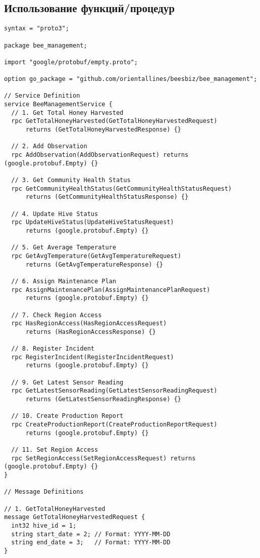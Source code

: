 \documentclass{article}
\begin{document}
\subsection{Использование функций/процедур}

\begin{lstlisting}
syntax = "proto3";

package bee_management;

import "google/protobuf/empty.proto";

option go_package = "github.com/orientallines/beesbiz/bee_management";

// Service Definition
service BeeManagementService {
  // 1. Get Total Honey Harvested
  rpc GetTotalHoneyHarvested(GetTotalHoneyHarvestedRequest)
      returns (GetTotalHoneyHarvestedResponse) {}

  // 2. Add Observation
  rpc AddObservation(AddObservationRequest) returns (google.protobuf.Empty) {}

  // 3. Get Community Health Status
  rpc GetCommunityHealthStatus(GetCommunityHealthStatusRequest)
      returns (GetCommunityHealthStatusResponse) {}

  // 4. Update Hive Status
  rpc UpdateHiveStatus(UpdateHiveStatusRequest)
      returns (google.protobuf.Empty) {}

  // 5. Get Average Temperature
  rpc GetAvgTemperature(GetAvgTemperatureRequest)
      returns (GetAvgTemperatureResponse) {}

  // 6. Assign Maintenance Plan
  rpc AssignMaintenancePlan(AssignMaintenancePlanRequest)
      returns (google.protobuf.Empty) {}

  // 7. Check Region Access
  rpc HasRegionAccess(HasRegionAccessRequest)
      returns (HasRegionAccessResponse) {}

  // 8. Register Incident
  rpc RegisterIncident(RegisterIncidentRequest)
      returns (google.protobuf.Empty) {}

  // 9. Get Latest Sensor Reading
  rpc GetLatestSensorReading(GetLatestSensorReadingRequest)
      returns (GetLatestSensorReadingResponse) {}

  // 10. Create Production Report
  rpc CreateProductionReport(CreateProductionReportRequest)
      returns (google.protobuf.Empty) {}

  // 11. Set Region Access
  rpc SetRegionAccess(SetRegionAccessRequest) returns (google.protobuf.Empty) {}
}

// Message Definitions

// 1. GetTotalHoneyHarvested
message GetTotalHoneyHarvestedRequest {
  int32 hive_id = 1;
  string start_date = 2; // Format: YYYY-MM-DD
  string end_date = 3;   // Format: YYYY-MM-DD
}


\end{lstlisting}
\end{document}
